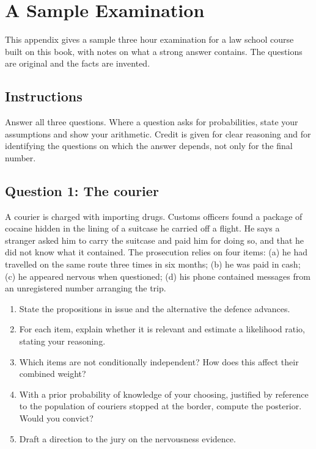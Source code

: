 \chapter{A Sample Examination}
\label{app:exam}

This appendix gives a sample three hour examination for a law school course built on this book, with notes on what a strong answer contains. The questions are original and the facts are invented.

\section*{Instructions}
Answer all three questions. Where a question asks for probabilities, state your assumptions and show your arithmetic. Credit is given for clear reasoning and for identifying the questions on which the answer depends, not only for the final number.

\section*{Question 1: The courier}
A courier is charged with importing drugs. Customs officers found a package of cocaine hidden in the lining of a suitcase he carried off a flight. He says a stranger asked him to carry the suitcase and paid him for doing so, and that he did not know what it contained. The prosecution relies on four items: (a) he had travelled on the same route three times in six months; (b) he was paid in cash; (c) he appeared nervous when questioned; (d) his phone contained messages from an unregistered number arranging the trip.

\begin{enumerate}[label=(\alph*)]
\item State the propositions in issue and the alternative the defence advances.
\item For each item, explain whether it is relevant and estimate a likelihood ratio, stating your reasoning.
\item Which items are not conditionally independent? How does this affect their combined weight?
\item With a prior probability of knowledge of your choosing, justified by reference to the population of couriers stopped at the border, compute the posterior. Would you convict?
\item Draft a direction to the jury on the nervousness evidence.
\end{enumerate}

